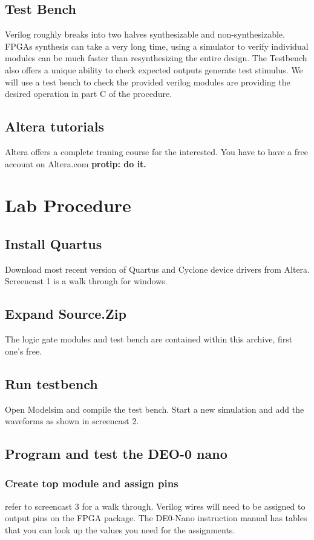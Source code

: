 \documentclass[12pt,journal]{IEEEtran}
\begin{document}
  \subsection{Test Bench}
    Verilog roughly breaks into two halves synthesizable and non-synthesizable. FPGAs synthesis can
    take a very long time, using a simulator to verify individual modules can be much faster than
    resynthesizing the entire design. The Testbench also offers a unique ability to check expected
    outputs generate test stimulus. We will use a test bench to check the provided verilog modules
    are providing the desired operation in part C of the procedure.

  \subsection{Altera tutorials}
    Altera offers a complete traning course for the interested. You have to have a free account
    on Altera.com {\bfseries protip: do it.}

  \section{\bfseries Lab Procedure}
    \subsection{Install Quartus}
      Download most recent version of Quartus and Cyclone device drivers from Altera. Screencast 1
      is a walk through for windows.
    \subsection{Expand Source.Zip}
      The logic gate modules and test bench are contained within this archive, first one's free.
    \subsection{Run testbench}
      Open Modelsim and compile the test bench. Start a new simulation and add the waveforms as 
      shown in screencast 2.
    \subsection{Program and test the DEO-0 nano}
      \subsubsection{Create top module and assign pins} refer to screencast 3 for a walk through. Verilog wires
      will need to be assigned to output pins on the FPGA package. The DE0-Nano instruction manual has tables
      that you can look up the values you need for the assignments.
\end{document}
